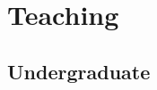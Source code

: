 \documentclass[11pt, a4paper]{article}
\newcommand{\Duration}[2]{\fontsize{10pt}{0}\selectfont #1--#2}
\newcommand{\Year}[1]{\fontsize{10pt}{0}\selectfont #1}
\newcommand{\Ongoing}{}
\begin{document}
\section{Teaching}

\subsection{Undergraduate}

\begin{EntriesTable}
\end{EntriesTable}
\end{document}
